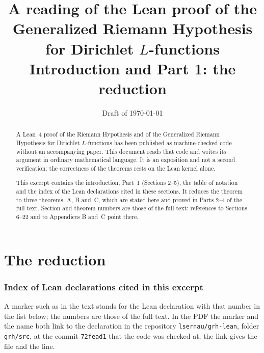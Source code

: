 

\title[A reading of a formal proof of GRH: Part 1]{A reading of the Lean proof
of the Generalized Riemann Hypothesis for Dirichlet $L$-functions\\ Introduction and Part 1: the reduction}

\date{Draft of \today}

\begin{abstract}
A Lean~4 proof of the Riemann Hypothesis and of the Generalized Riemann Hypothesis for Dirichlet
$L$-functions has been published as machine-checked code without an accompanying paper. This
document reads that code and writes its argument in ordinary mathematical language. It is an
exposition and not a second verification: the correctness of the theorems rests on the Lean
kernel alone.

This excerpt contains the introduction, Part~1 (Sections 2--5), the table of notation and the
index of the Lean declarations cited in these sections. It reduces the theorem to three theorems,
A, B and~C, which are stated here and proved in Parts 2--4 of the full text. Section and theorem
numbers are those of the full text: references to Sections 6--22 and to Appendices B and~C point
there.
\end{abstract}
\maketitle
\tableofcontents

\part{The reduction}




\appendix

\setcounter{section}{3}
\section{Index of Lean declarations cited in this excerpt}\label{sec:app-leanindex}
A marker such as  in the text stands for the Lean declaration with that number in
the list below; the numbers are those of the full text. In the PDF the marker and the name both
link to the declaration in the repository \texttt{lsernau/grh-lean}, folder \texttt{grh/src}, at
the commit \texttt{72fead1} that the code was checked at; the link gives the file and the line.

\printleanindex

